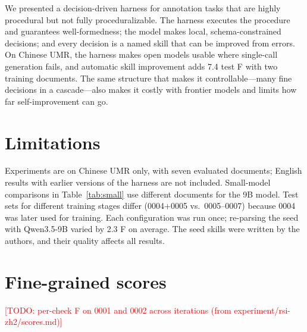 \documentclass[11pt]{article}
\newcommand{\umr}{\textsc{UMR}\xspace}
\newcommand{\todo}[1]{\textcolor{red}{[TODO: #1]}}
\begin{document}
We presented a decision-driven harness for annotation tasks that are highly procedural but not fully proceduralizable. The harness executes the procedure and guarantees well-formedness; the model makes local, schema-constrained decisions; and every decision is a named skill that can be improved from errors. On Chinese \umr, the harness makes open models usable where single-call generation fails, and automatic skill improvement adds 7.4 test F with two training documents. The same structure that makes it controllable---many fine decisions in a cascade---also makes it costly with frontier models and limits how far self-improvement can go.

\section*{Limitations}

Experiments are on Chinese \umr only, with seven evaluated documents; English results with earlier versions of the harness are not included. Small-model comparisons in Table~\ref{tab:small} use different documents for the 9B model. Test sets for different training stages differ (0004+0005 vs.\ 0005--0007) because 0004 was later used for training. Each configuration was run once; re-parsing the seed with Qwen3.5-9B varied by 2.3 F on average. The seed skills were written by the authors, and their quality affects all results.



\appendix
\section{Fine-grained scores}
\label{app:judge}
\todo{per-check F on 0001 and 0002 across iterations (from experiment/rsi-zh2/scores.md)}
\end{document}
